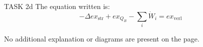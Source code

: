 TASK 2d  
The equation written is:  
\[
- \Delta ex_{\text{str}} + ex_{Q_B} - \sum_{i} \dot{W}_i = ex_{\text{verl}}
\]  

No additional explanation or diagrams are present on the page.